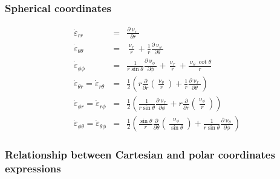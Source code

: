 \subsubsection{Spherical coordinates \label{ss:srsc}}

\begin{eqnarray}
\dot\varepsilon_{rr} 
&=& \frac{\partial \upnu_r}{\partial r} \\
\dot\varepsilon_{\theta\theta} 
&=& \frac{\upnu_r}{r} + \frac{1}{r} \frac{\partial \upnu_\theta}{\partial \theta}  \\
\dot\varepsilon_{\phi\phi} 
&=& \frac{1}{r \sin\theta} \frac{\partial \upnu_\phi}{\partial \phi} +
\frac{\upnu_r}{r} +\frac{\upnu_\theta \cot \theta}{r} \\
\dot\varepsilon_{\theta r} = \dot\varepsilon_{r\theta}   
&=& \frac{1}{2} \left( r \frac{\partial}{\partial r} (\frac{\upnu_\theta}{r} ) 
+\frac{1}{r} \frac{\partial \upnu_r}{\partial \theta} \right) \\
\dot\varepsilon_{\phi r} = \dot\varepsilon_{r\phi}      
&=&  \frac{1}{2} \left(  \frac{1}{r \sin\theta} \frac{\partial \upnu_r}{\partial \phi} 
+ r \frac{\partial }{\partial r} (\frac{\upnu_\phi}{r}) \right)  \\
\dot\varepsilon_{\phi \theta} = \dot\varepsilon_{\theta\phi} 
&=& \frac{1}{2} \left( \frac{\sin \theta}{r} \frac{\partial }{\partial \theta} (\frac{\upnu_\phi}{\sin\theta}) + \frac{1}{r \sin\theta} \frac{\partial \upnu_\theta}{\partial \phi}    \right) 
\end{eqnarray}



\subsubsection{Relationship between Cartesian and polar coordinates expressions}


